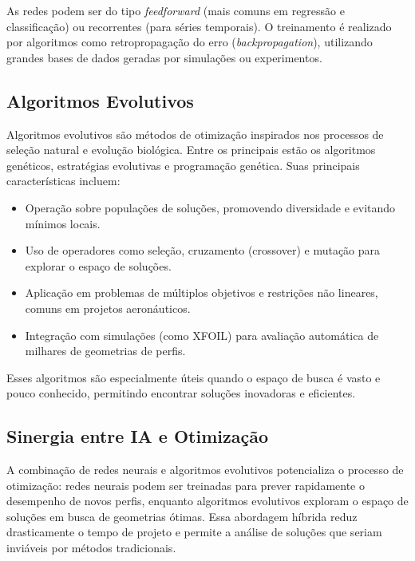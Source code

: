 As redes podem ser do tipo \textit{feedforward} (mais comuns em regressão e classificação) ou recorrentes (para séries temporais). O treinamento é realizado por algoritmos como retropropagação do erro (\textit{backpropagation}), utilizando grandes bases de dados geradas por simulações ou experimentos.

\subsection{Algoritmos Evolutivos}
Algoritmos evolutivos são métodos de otimização inspirados nos processos de seleção natural e evolução biológica. Entre os principais estão os algoritmos genéticos, estratégias evolutivas e programação genética. Suas principais características incluem:

\begin{itemize}
    \item Operação sobre populações de soluções, promovendo diversidade e evitando mínimos locais.
    \item Uso de operadores como seleção, cruzamento (crossover) e mutação para explorar o espaço de soluções.
    \item Aplicação em problemas de múltiplos objetivos e restrições não lineares, comuns em projetos aeronáuticos.
    \item Integração com simulações (como XFOIL) para avaliação automática de milhares de geometrias de perfis.
\end{itemize}

Esses algoritmos são especialmente úteis quando o espaço de busca é vasto e pouco conhecido, permitindo encontrar soluções inovadoras e eficientes.

\subsection{Sinergia entre IA e Otimização}
A combinação de redes neurais e algoritmos evolutivos potencializa o processo de otimização: redes neurais podem ser treinadas para prever rapidamente o desempenho de novos perfis, enquanto algoritmos evolutivos exploram o espaço de soluções em busca de geometrias ótimas. Essa abordagem híbrida reduz drasticamente o tempo de projeto e permite a análise de soluções que seriam inviáveis por métodos tradicionais.